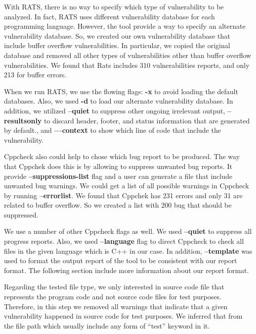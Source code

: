 \begin{itemize}[leftmargin=*]
With RATS, there is no way to specify which type of vulnerability to be analyzed. In fact, RATS uses different vulnerability database for each programming language. However, the tool provide a way to specify an alternate vulnerability database. So, we created our own vulnerability database that include buffer overflow vulnerabilities. In particular, we copied the original database and removed all other types of vulnerabilities other than buffer overflow vulnerabilities. We found that Rats includes 310 vulnerabilities reports, and only 213 for buffer errors.

When we run RATS, we use the flowing flags:  \textbf{-x} to avoid loading the default databases. Also, we used \textbf{-d} to load our alternate vulnerability database. 
In addition, we utilized  \textbf{--quiet} to suppress other ongoing irrelevant output, \textbf{ --resultsonly} to discard header, footer, and status information that are generated by default., and \textbf{---context} to show which line of code that include the vulnerability.

Cppcheck also could help to chose which bug report to be produced. The way that Cppchek does this is by allowing to suppress unwanted bug reports. It provide \textbf{--suppressions-list} flag and a user can generate a file that include unwanted bug warnings. We could get a list of all possible warnings in Cppcheck by running \textbf{--errorlist}. We found that Cppchek has 231 errors and only 31 are related to buffer overflow. So we created a list with 200 bug that should be suppressed.



We use a number of other Cppcheck flags as  well. We used \textbf{--quiet} to suppress all progress reports. Also, we used \textbf{ --language} flag to direct Cppcheck to check all files in the given language which is C++ in our case. In addition, \textbf{--template} was used to format the output report of the tool to be consistent with our report format. The following section include more information about our report format.  


Regarding the tested file type, we only interested in source code file that represents the program code and not source code files for test purposes. Therefore, in this step we removed all warnings that indicate that a given vulnerability happened in source code for test purposes. We inferred that from the file path which usually include any form of ``test'' keyword in it.
 



\end{itemize}
